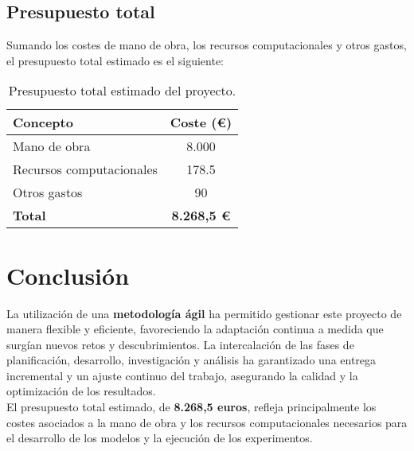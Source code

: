 \subsection{Presupuesto total}\label{subsec:presupuesto-total}
Sumando los costes de mano de obra, los recursos computacionales y otros gastos, el presupuesto total estimado es el
siguiente:

\begin{table}[htp]\label{tab:presupuesto-total}
    \centering
    \begin{tabular}{|l|c|}
        \hline
        \textbf{Concepto} & \textbf{Coste (€)} \\ \hline
        Mano de obra & 8.000 \\
        Recursos computacionales & 178.5 \\
        Otros gastos & 90 \\ \hline
        \textbf{Total} & \textbf{8.268,5 €} \\ \hline
    \end{tabular}
    \caption{Presupuesto total estimado del proyecto.}
\end{table}


\section{Conclusión}\label{sec:conclusion}
La utilización de una \textbf{metodología ágil} ha permitido gestionar este proyecto de manera flexible y eficiente,
favoreciendo la adaptación continua a medida que surgían nuevos retos y descubrimientos.
La intercalación de las fases de planificación, desarrollo, investigación y análisis ha garantizado una entrega
incremental y un ajuste continuo del trabajo, asegurando la calidad y la optimización de los resultados. \\[6pt]

El presupuesto total estimado, de \textbf{8.268,5 euros}, refleja principalmente los costes asociados a la mano de obra y
los recursos computacionales necesarios para el desarrollo de los modelos y la ejecución de los experimentos.
